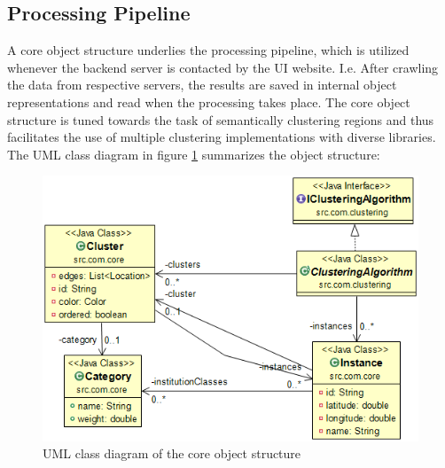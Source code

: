 \subsection{Processing Pipeline}
A core object structure underlies the processing pipeline, which is utilized whenever the backend server is contacted by the UI website. I.e. After crawling the data from respective servers, the results are saved in internal object representations and read when the processing takes place. The core object structure is tuned towards the task of semantically clustering regions and thus facilitates the use of multiple clustering implementations with diverse libraries. The UML class diagram in figure \ref{fig:cos} summarizes the object structure:
 
\begin{figure}
  \centering
    \includegraphics[scale=0.5]{./content/cos.png}
  \caption{UML class diagram of the core object structure}\label{fig:cos}
\end{figure}


